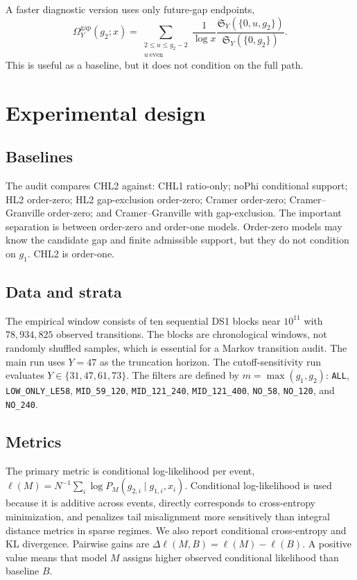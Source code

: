 \documentclass[10pt]{article}
\newcommand{\SY}{\mathfrak{S}_Y}
\newcommand{\loglik}{\ell}
\begin{document}
A faster diagnostic version uses only future-gap endpoints,
\[
\Omega_Y^{\mathrm{gap}}(g_2;x)=\sum_{\substack{2\le u\le g_2-2\\u\ \mathrm{even}}}\frac{1}{\log x}\frac{\SY(\{0,u,g_2\})}{\SY(\{0,g_2\})}.
\]
This is useful as a baseline, but it does not condition on the full path.
\section{Experimental design}
\subsection{Baselines}
The audit compares CHL2 against: CHL1 ratio-only; noPhi conditional support; HL2 order-zero; HL2 gap-exclusion order-zero; Cramer order-zero; Cramer--Granville order-zero; and Cramer--Granville with gap-exclusion. The important separation is between order-zero and order-one models. Order-zero models may know the candidate gap and finite admissible support, but they do not condition on $g_1$. CHL2 is order-one.
\subsection{Data and strata}
The empirical window consists of ten sequential DS1 blocks near $10^{11}$ with $78{,}934{,}825$ observed transitions. The blocks are chronological windows, not randomly shuffled samples, which is essential for a Markov transition audit. The main run uses $Y=47$ as the truncation horizon. The cutoff-sensitivity run evaluates $Y\in\{31,47,61,73\}$. The filters are defined by $m=\max(g_1,g_2)$: \texttt{ALL}, \texttt{LOW\_ONLY\_LE58}, \texttt{MID\_59\_120}, \texttt{MID\_121\_240}, \texttt{MID\_121\_400}, \texttt{NO\_58}, \texttt{NO\_120}, and \texttt{NO\_240}.
\subsection{Metrics}
The primary metric is conditional log-likelihood per event, $\loglik(M)=N^{-1}\sum_i \log P_M(g_{2,i}\mid g_{1,i},x_i)$. Conditional log-likelihood is used because it is additive across events, directly corresponds to cross-entropy minimization, and penalizes tail misalignment more sensitively than integral distance metrics in sparse regimes. We also report conditional cross-entropy and KL divergence. Pairwise gains are $\Delta\loglik(M,B)=\loglik(M)-\loglik(B)$. A positive value means that model $M$ assigns higher observed conditional likelihood than baseline $B$.
\end{document}
